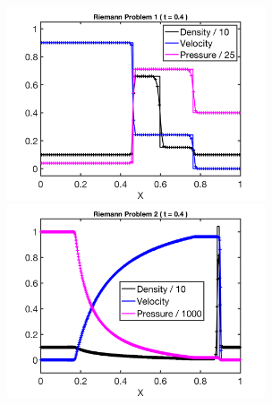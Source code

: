 \documentclass[letterpaper]{jpconf}
\begin{document}
\begin{figure}[h]
  \centering
  \begin{minipage}{18pc}
    \includegraphics[width=18pc]{./Figures/MB2005_01_Astronum_2018}
  \end{minipage}\hspace{0.5pc}%
  \begin{minipage}{18pc}
    \includegraphics[width=18pc]{./Figures/MB2005_04_Astronum_2018}
  \end{minipage} \\
  \begin{minipage}{18pc}

\end{minipage}
\end{figure}
\end{document}
